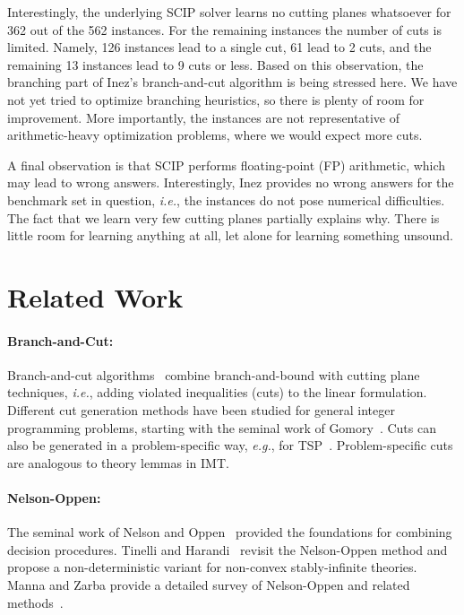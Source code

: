 \documentclass{llncs}
\newcommand{\inez}[0]{\textsf{Inez}}
\newcommand{\comment}[1]{}
\newcommand{\ie}[0]{\emph{i.e.}, }
\newcommand{\eg}[0]{\emph{e.g.}, }
\begin{document}
Interestingly, the underlying SCIP solver learns no cutting planes
whatsoever for 362 out of the 562 instances. For the remaining
instances the number of cuts is limited. Namely, 126 instances lead to
a single cut, 61 lead to 2 cuts, and the remaining 13 instances lead
to 9 cuts or less. Based on this observation, the branching part of
\inez{}'s branch-and-cut algorithm is being stressed here. We have
not yet tried to optimize branching heuristics, so there is plenty of
room for improvement. More importantly, the instances are not
representative of arithmetic-heavy optimization problems, where we
would expect more cuts.

A final observation is that SCIP performs floating-point (FP)
arithmetic, which may lead to wrong answers. Interestingly, \inez{}
provides no wrong answers for the benchmark set in question, \ie the
instances do not pose numerical difficulties. The fact that we learn
very few cutting planes partially explains why. There is little room
for learning anything at all, let alone for learning something
unsound.

\section{Related Work}
\label{sec:related}

\paragraph{Branch-and-Cut:} 
Branch-and-cut algorithms~\cite{branchandcut-handbook} combine
branch-and-bound with cutting plane techniques, \ie adding violated
inequalities (cuts) to the linear formulation. Different cut
generation methods have been studied for general integer programming
problems, starting with the seminal work of
Gomory~\cite{gomory63}. Cuts can also be generated in a
problem-specific way, \eg for TSP~\cite{gh91}. Problem-specific cuts
are analogous to theory lemmas in IMT.

\paragraph{Nelson-Oppen:} 
The seminal work of Nelson and Oppen~\cite{no79} provided the
foundations for combining decision procedures. Tinelli and
Harandi~\cite{noproof} revisit the Nelson-Oppen method and propose a
non-deterministic variant for non-convex stably-infinite
theories. Manna and Zarba provide a detailed survey of Nelson-Oppen
and related methods~\cite{combiningdp}.\comment{On a fundamental
  level, IMT combines  and a theory , so this line of results
  directly applies to our framework.}
\end{document}
